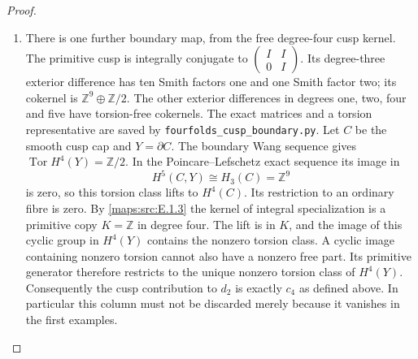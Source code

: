 \begin{proof}
\begin{enumerate}[label=\arabic*.]
\item There is one further boundary map, from the free
degree-four cusp kernel.
The primitive cusp is integrally conjugate to
$\left(\begin{smallmatrix}I&I\\0&I\end{smallmatrix}\right)$.
Its degree-three exterior difference has ten Smith
factors one and one Smith factor two; its cokernel is
$\mathbb Z^9\oplus\mathbb Z/2$.
The other exterior differences in degrees one, two,
four and five have torsion-free cokernels.
The exact matrices and a torsion representative are
saved by \texttt{fourfolds\_cusp\_boundary.py}.
Let $C$ be the smooth cusp cap and $Y=\partial C$.
The boundary Wang sequence gives
$\operatorname{Tor}H^4(Y)=\mathbb Z/2$.
In the Poincare--Lefschetz exact sequence its image in
\[
 H^5(C,Y)\cong H_3(C)=\mathbb Z^9
\]
is zero, so this torsion class lifts to $H^4(C)$.
Its restriction to an ordinary fibre is zero.
By \ref{maps:src:E.1.3} the kernel of integral specialization is
a primitive copy $K=\mathbb Z$ in degree four.
The lift is in $K$, and the image of this cyclic group
in $H^4(Y)$ contains the nonzero torsion class.
A cyclic image containing nonzero torsion cannot
also have a nonzero free part.
Its primitive generator therefore restricts to the
unique nonzero torsion class of $H^4(Y)$.
Consequently the cusp contribution to $d_2$ is
exactly $c_4$ as defined above.  In particular this
column must not be discarded merely because it
vanishes in the first examples.


\end{enumerate}
\end{proof}
